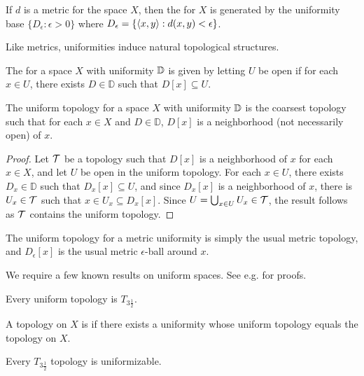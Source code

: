 \begin{defn}
  If $d$ is a metric for the space $X$, then the  for
  $X$ is generated by the uniformity base $\{D_\epsilon:\epsilon>0\}$
  where $D_\epsilon = \{\langle x,y\rangle:d(x,y)<\epsilon\}$.
\end{defn}

Like metrics, uniformities induce natural topological structures.

\begin{defn}
  The  for a space $X$ with uniformity $\mathbb{D}$ is given
  by letting $U$ be open if for each $x\in U$, there exists $D\in\mathbb{D}$
  such that $D[x]\subseteq U$.
\end{defn}

\begin{thm}
  The uniform topology for a space $X$ with uniformity $\mathbb{D}$ is the coarsest
  topology such that for each $x\in X$ and $D\in\mathbb{D}$,
  $D[x]$ is a neighborhood (not necessarily open) of $x$.
\end{thm}

\begin{proof}
  Let $\mathcal{T}$ be a topology such that $D[x]$ is a neighborhood
  of $x$ for each $x\in X$, and let $U$ be open in the uniform topology.
  For each $x\in U$, there exists $D_x\in\mathbb{D}$ such that
  $D_x[x]\subseteq U$, and since $D_x[x]$ is a neighborhood of $x$, there
  is $U_x\in \mathcal{T}$ such that $x\in U_x\subseteq D_x[x]$. Since
  $U=\bigcup_{x\in U}U_x\in \mathcal{T}$, the result follows as $\mathcal{T}$ contains the
  uniform topology.
\end{proof}

The uniform topology
for a metric uniformity is simply the usual metric topology, and $D_\epsilon[x]$
is the usual metric $\epsilon$-ball around $x$.

We require a few known results on uniform spaces. See e.g. \cite{MR1039321}
for proofs.

\begin{thm}
  Every uniform topology is $T_{3\frac{1}{2}}$.
\end{thm}

\begin{defn}
  A topology on $X$ is  if there exists
  a uniformity whose uniform topology equals the topology on $X$.
\end{defn}

\begin{thm}
  Every $T_{3\frac{1}{2}}$ topology is uniformizable.
\end{thm}

